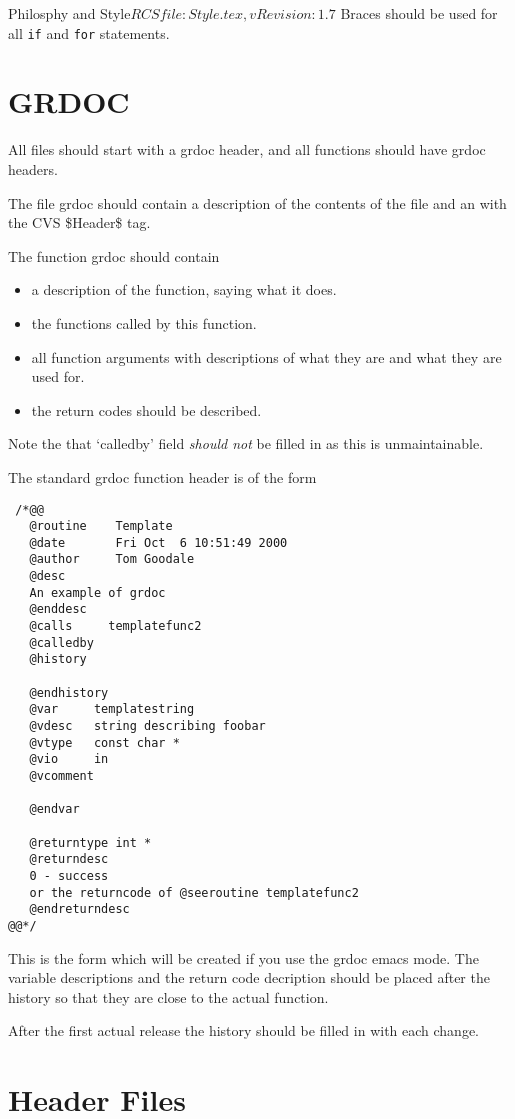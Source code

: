 \begin{cactuspart}{1}{Philosphy and Style}{$RCSfile: Style.tex,v $}{$Revision: 1.7 $}
Braces should be used for all {\tt if} and {\tt for} statements.

\section{GRDOC}

All files should start with a grdoc header, and all functions
should have grdoc headers.

The file grdoc should contain a description of the contents of the file
and an \@version with the CVS \$Header\$ tag.

The function grdoc should contain

\begin{itemize}
\item
a description of the function, saying what it does.
\item
the functions called by this function.
\item
all function arguments with descriptions
of what they are and what they are used for.
\item
the return codes should be described.
\end{itemize}

Note the that `calledby' field {\em should not} be filled in as
this is unmaintainable.

The standard grdoc function header is of the form

\begin{verbatim}
 /*@@
   @routine    Template
   @date       Fri Oct  6 10:51:49 2000
   @author     Tom Goodale
   @desc 
   An example of grdoc
   @enddesc 
   @calls     templatefunc2
   @calledby   
   @history 
 
   @endhistory 
   @var     templatestring
   @vdesc   string describing foobar
   @vtype   const char *
   @vio     in
   @vcomment 
 
   @endvar 

   @returntype int *
   @returndesc
   0 - success
   or the returncode of @seeroutine templatefunc2
   @endreturndesc
@@*/
\end{verbatim}

This is the form which will be created if you use the grdoc emacs mode.  
The variable descriptions and the return code decription should be placed
after the history so that they are close to the actual function.

After the first actual release the history should be filled
in with each change.

\section{Header Files}


\end{cactuspart}
